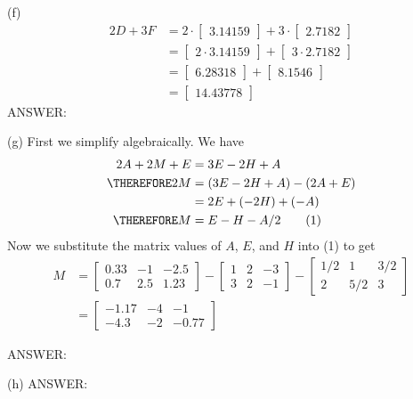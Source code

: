 (f)
\begin{align*}
2D + 3F &= 2 \cdot \begin{bmatrix}
3.14159
\end{bmatrix}
+
3 \cdot \begin{bmatrix}
2.7182
\end{bmatrix} \\
&= \begin{bmatrix}
2 \cdot 3.14159
\end{bmatrix}
+
\begin{bmatrix}
3 \cdot 2.7182
\end{bmatrix} \\
&= \begin{bmatrix}
6.28318
\end{bmatrix}
+
\begin{bmatrix}
8.1546
\end{bmatrix} \\
&= \begin{bmatrix}
14.43778
\end{bmatrix}
\end{align*}
ANSWER: 

(g) First we simplify algebraically.
We have
\begin{align*}
            2A + 2M + E &= 3E - 2H + A           \\
\THEREFORE  2M          &= (3E - 2H + A) - (2A + E) \\
                        &= 2E + (-2H) + (-A)    \\
\THEREFORE  M           &= E - H - A/2                   \tag{1} \\
\end{align*}
Now we substitute the matrix values of $A$, $E$, and $H$ into (1) to get
\begin{align*}
M &= \begin{bmatrix}
0.33 & -1 & -2.5 \\
0.7 & 2.5 & 1.23
\end{bmatrix}
-
\begin{bmatrix}
1 & 2 & -3 \\
3 & 2 & -1
\end{bmatrix}
-
\begin{bmatrix}
1/2 & 1 & 3/2 \\
2 & 5/2 & 3
\end{bmatrix} \\
  &= \begin{bmatrix}
-1.17 & -4 & -1 \\
-4.3 & -2 & -0.77
\end{bmatrix}
\end{align*}

ANSWER: 

(h)
ANSWER: 

